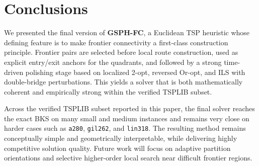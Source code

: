\documentclass[runningheads]{llncs}
\begin{document}
\section{Conclusions}
\label{sec:conclusions}

We presented the final version of \textbf{GSPH-FC}, a Euclidean TSP
heuristic whose defining feature is to make frontier connectivity a
first-class construction principle. Frontier pairs are selected before
local route construction, used as explicit entry/exit anchors for the
quadrants, and followed by a strong time-driven polishing stage based
on localized 2-opt, reversed Or-opt, and ILS with double-bridge
perturbations. This yields a solver that is both mathematically
coherent and empirically strong within the verified TSPLIB subset.

Across the verified TSPLIB subset reported in this paper, the final
solver reaches the exact BKS on many small and medium instances and
remains very close on harder cases such as \texttt{a280},
\texttt{gil262}, and \texttt{lin318}. The resulting method remains
conceptually simple and geometrically interpretable, while delivering
highly competitive solution quality. Future work will focus on adaptive
partition orientations and selective higher-order local search near
difficult frontier regions.

%



\end{document}
